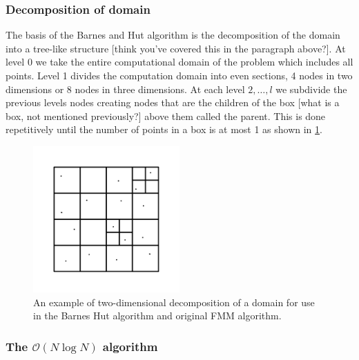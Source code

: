 \subsubsection{Decomposition of domain}\label{sec:Decomposition}
The basis of the Barnes and Hut algorithm is the decomposition of the domain into a tree-like structure [think you've covered this in the paragraph above?]. At level 0 we take the entire computational domain of the problem which includes all points. Level 1 divides the computation domain into even sections, 4 nodes in two dimensions or 8 nodes in three dimensions. At each level $2,\dots,l$ we subdivide the previous levels nodes creating nodes that are the children of the box [what is a box, not mentioned previously?] above them called the parent. This is done repetitively until the number of points in a box is at most 1 as shown in \cref{fig:2DDecompostion}.

\begin{figure}
    \centering
    \includegraphics[width=0.5\textwidth]{Images/KIFMM/Decomposition.pdf}
    \caption{An example of two-dimensional decomposition of a domain for use in the Barnes Hut algorithm and original FMM algorithm.}
    \label{fig:2DDecompostion}
\end{figure}

\subsubsection{\texorpdfstring{The $\mathcal{O}(N\log N)$ algorithm}{The O(NlogN) algorithm}}

